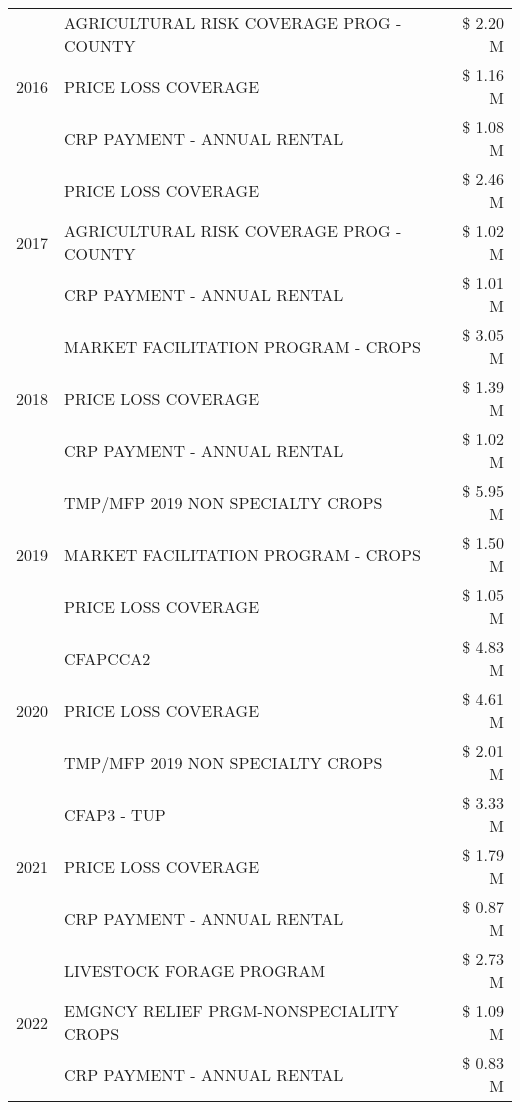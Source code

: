 \begin{tabular}{llr}
\cline{1-3}
\multirow[t]{3}{*}{2016} & AGRICULTURAL RISK COVERAGE PROG - COUNTY & \$ 2.20 M \\
 & PRICE LOSS COVERAGE & \$ 1.16 M \\
 & CRP PAYMENT - ANNUAL RENTAL & \$ 1.08 M \\
\cline{1-3}
\multirow[t]{3}{*}{2017} & PRICE LOSS COVERAGE & \$ 2.46 M \\
 & AGRICULTURAL RISK COVERAGE PROG - COUNTY & \$ 1.02 M \\
 & CRP PAYMENT - ANNUAL RENTAL & \$ 1.01 M \\
\cline{1-3}
\multirow[t]{3}{*}{2018} & MARKET FACILITATION PROGRAM - CROPS & \$ 3.05 M \\
 & PRICE LOSS COVERAGE & \$ 1.39 M \\
 & CRP PAYMENT - ANNUAL RENTAL & \$ 1.02 M \\
\cline{1-3}
\multirow[t]{3}{*}{2019} & TMP/MFP 2019 NON SPECIALTY CROPS & \$ 5.95 M \\
 & MARKET FACILITATION PROGRAM - CROPS & \$ 1.50 M \\
 & PRICE LOSS COVERAGE & \$ 1.05 M \\
\cline{1-3}
\multirow[t]{3}{*}{2020} & CFAPCCA2 & \$ 4.83 M \\
 & PRICE LOSS COVERAGE & \$ 4.61 M \\
 & TMP/MFP 2019 NON SPECIALTY CROPS & \$ 2.01 M \\
\cline{1-3}
\multirow[t]{3}{*}{2021} & CFAP3 - TUP & \$ 3.33 M \\
 & PRICE LOSS COVERAGE & \$ 1.79 M \\
 & CRP PAYMENT - ANNUAL RENTAL & \$ 0.87 M \\
\cline{1-3}
\multirow[t]{3}{*}{2022} & LIVESTOCK FORAGE PROGRAM & \$ 2.73 M \\
 & EMGNCY RELIEF PRGM-NONSPECIALITY CROPS & \$ 1.09 M \\
 & CRP PAYMENT - ANNUAL RENTAL & \$ 0.83 M \\
\cline{1-3}
\bottomrule
\end{tabular}
